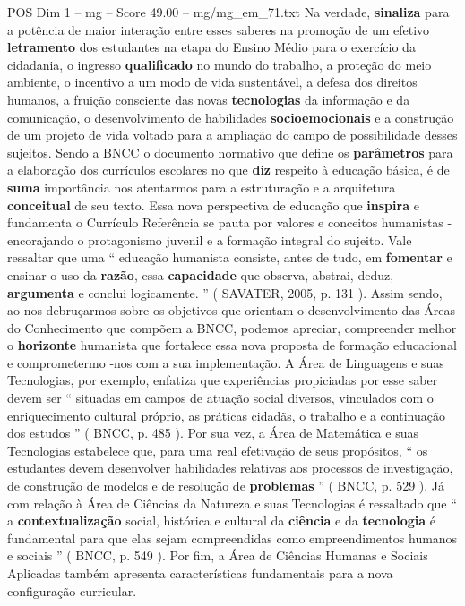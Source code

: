 \begin{textsample}{POS Dim 1 – mg – Score 49.00 – mg/mg\_em\_71.txt}
Na verdade, \textbf{sinaliza} para a potência de maior interação entre esses saberes na promoção de um efetivo \textbf{letramento} dos estudantes na etapa do Ensino Médio para o exercício da cidadania, o ingresso \textbf{qualificado} no mundo do trabalho, a proteção do meio ambiente, o incentivo a um modo de vida sustentável, a defesa dos direitos humanos, a fruição consciente das novas \textbf{tecnologias} da informação e da comunicação, o desenvolvimento de habilidades \textbf{socioemocionais} e a construção de um projeto de vida voltado para a ampliação do campo de possibilidade desses sujeitos.
Sendo a BNCC o documento normativo que define os \textbf{parâmetros} para a elaboração dos currículos escolares no que \textbf{diz} respeito à educação básica, é de \textbf{suma} importância nos atentarmos para a estruturação e a arquitetura \textbf{conceitual} de seu texto.
Essa nova perspectiva de educação que \textbf{inspira} e fundamenta o Currículo Referência se pauta por valores e conceitos humanistas - encorajando o protagonismo juvenil e a formação integral do sujeito.
Vale ressaltar que uma “ educação humanista consiste, antes de tudo, em \textbf{fomentar} e ensinar o uso da \textbf{razão}, essa \textbf{capacidade} que observa, abstrai, deduz, \textbf{argumenta} e conclui logicamente. ” ( SAVATER, 2005, p. 131 ).
Assim sendo, ao nos debruçarmos sobre os objetivos que orientam o desenvolvimento das Áreas do Conhecimento que compõem a BNCC, podemos apreciar, compreender melhor o \textbf{horizonte} humanista que fortalece essa nova proposta de formação educacional e comprometermo -nos com a sua implementação.
A Área de Linguagens e suas Tecnologias, por exemplo, enfatiza que experiências propiciadas por esse saber devem ser “ situadas em campos de atuação social diversos, vinculados com o enriquecimento cultural próprio, as práticas cidadãs, o trabalho e a continuação dos estudos ” ( BNCC, p. 485 ).
Por sua vez, a Área de Matemática e suas Tecnologias estabelece que, para uma real efetivação de seus propósitos, “ os estudantes devem desenvolver habilidades relativas aos processos de investigação, de construção de modelos e de resolução de \textbf{problemas} ” ( BNCC, p. 529 ).
Já com relação à Área de Ciências da Natureza e suas Tecnologias é ressaltado que “ a \textbf{contextualização} social, histórica e cultural da \textbf{ciência} e da \textbf{tecnologia} é fundamental para que elas sejam compreendidas como empreendimentos humanos e sociais ” ( BNCC, p. 549 ).
Por fim, a Área de Ciências Humanas e Sociais Aplicadas também apresenta características fundamentais para a nova configuração curricular.

\end{textsample}
